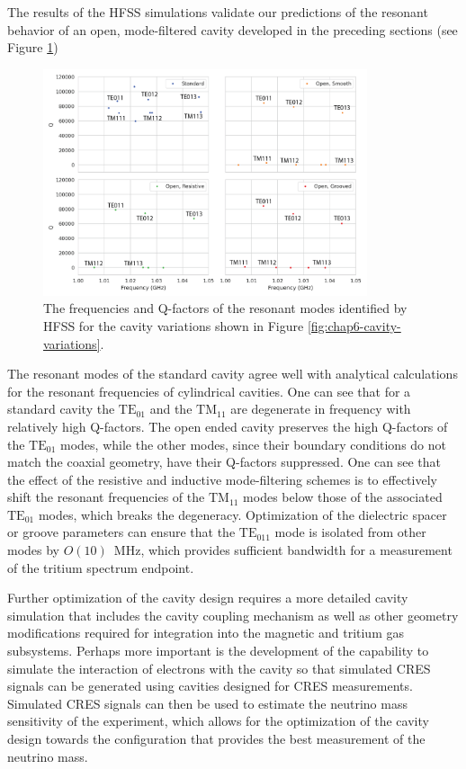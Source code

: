 The results of the HFSS simulations validate our predictions of the resonant behavior of an open, mode-filtered cavity developed in the preceding sections (see Figure \ref{fig:chap6-hfss-cavity-variation-results})
\begin{figure}[htbp]
    \centering
    \includegraphics*[width=0.85\textwidth]{figs/Chapter-6/230610_cavity_variation_eigenmodes_linear_annotate.png}
    \caption{\label{fig:chap6-hfss-cavity-variation-results} The frequencies and Q-factors of the resonant modes identified by HFSS for the cavity variations shown in Figure \ref{fig:chap6-cavity-variations}.}
\end{figure}
The resonant modes of the standard cavity agree well with analytical calculations for the resonant frequencies of cylindrical cavities. One can see that for a standard cavity the $\mathrm{TE}_{01}$ and the $\mathrm{TM}_{11}$ are degenerate in frequency with relatively high Q-factors. The open ended cavity preserves the high Q-factors of the $\mathrm{TE}_{01}$ modes, while the other modes, since their boundary conditions do not match the coaxial geometry, have their Q-factors suppressed. One can see that the effect of the resistive and inductive mode-filtering schemes is to effectively shift the resonant frequencies of the $\mathrm{TM}_{11}$ modes below those of the associated $\mathrm{TE}_{01}$ modes, which breaks the degeneracy. Optimization of the dielectric spacer or groove parameters can ensure that the $\mathrm{TE}_{011}$ mode is isolated from other modes by $O(10)$~MHz, which provides sufficient bandwidth for a measurement of the tritium spectrum endpoint.

Further optimization of the cavity design requires a more detailed cavity simulation that includes the cavity coupling mechanism as well as other geometry modifications required for integration into the magnetic and tritium gas subsystems. Perhaps more important is the development of the capability to simulate the interaction of electrons with the cavity so that simulated CRES signals can be generated using cavities designed for CRES measurements. Simulated CRES signals can then be used to estimate the neutrino mass sensitivity of the experiment, which allows for the optimization of the cavity design towards the configuration that provides the best measurement of the neutrino mass. 

